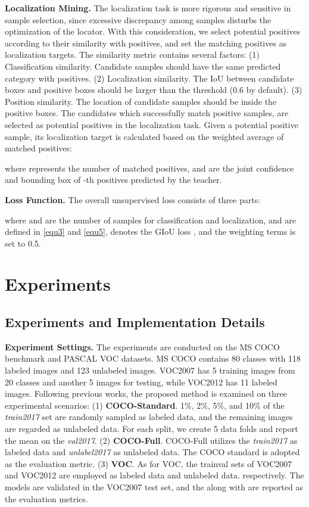 \documentclass[10pt,twocolumn,letterpaper]{article}
\begin{document}
\noindent\textbf{Localization Mining.}
The localization task is more rigorous and sensitive in sample selection, since excessive discrepancy among samples disturbs the optimization of the locator.
With this consideration, we select potential positives according to their similarity with positives, and set the matching positives as localization targets.
The similarity metric contains several factors: 
(1) Classification similarity. Candidate samples should have the same predicted category with positives. 
(2) Localization similarity. The IoU between candidate boxes and positive boxes should be larger than the threshold (0.6 by default). 
(3) Position similarity. The location of candidate samples should be inside the positive boxes.
The candidates which successfully match positive samples, are selected as potential positives in the localization task.
Given a potential positive sample, its localization target  is calculated based on the weighted average of matched positives:

where  represents the number of matched positives,  and  are the joint confidence and bounding box of -th positives predicted by the teacher.

\noindent\textbf{Loss Function.}
The overall unsupervised loss  consists of three parts:

where  and  are the number of samples for classification and localization,  and  are defined in \cref{equ3} and \cref{equ5},  denotes the GIoU loss \cite{GIoU}, and the weighting terms  is set to 0.5.





\section{Experiments}
\label{sec4}

\subsection{Experiments and Implementation Details}
\label{sec4.1}

\noindent\textbf{Experiment Settings.}
The experiments are conducted on the MS COCO\cite{Mscoco} benchmark and PASCAL VOC\cite{Pascalvoc} datasets.
MS COCO contains 80 classes with 118 labeled images and 123 unlabeled images.
VOC2007 has 5 training images from 20 classes and another 5 images for testing, while VOC2012 has 11 labeled images.
Following previous works, the proposed method is examined on three experimental scenarios: 
(1) \textbf{COCO-Standard}. 1\%, 2\%, 5\%, and 10\% of the \emph{train2017} set are randomly sampled as labeled data, and the remaining images are regarded as unlabeled data.
For each split, we create 5 data folds and report the mean  on the \emph{val2017}.
(2) \textbf{COCO-Full}. COCO-Full utilizes the \emph{train2017} as labeled data and \emph{unlabel2017} as unlabeled data. 
The COCO standard  is adopted as the evaluation metric.
(3) \textbf{VOC}. As for VOC, the trainval sets of VOC2007 and VOC2012 are employed as labeled data and unlabeled data. respectively. The models are validated in the VOC2007 test set, and the  along with  are reported as the evaluation metrics.
\end{document}

